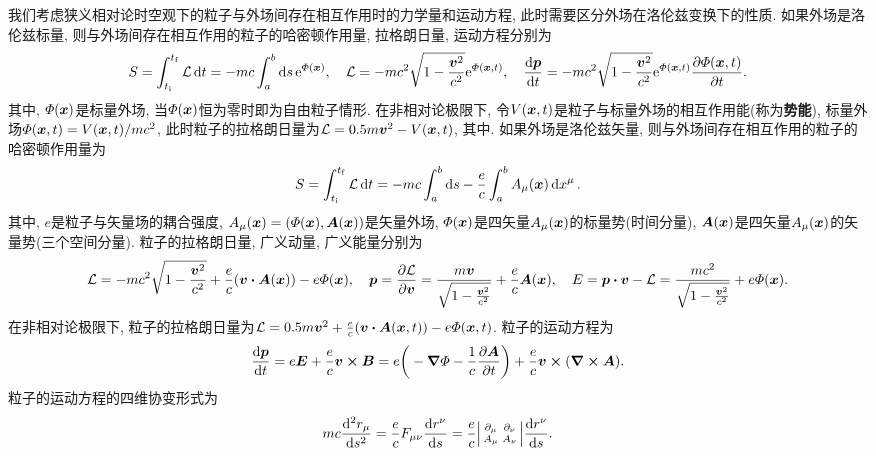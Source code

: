 我们考虑狭义相对论时空观下的粒子与外场间存在相互作用时的力学量和运动方程, 此时需要区分外场在洛伦兹变换下的性质. 如果外场是洛伦兹标量, 则与外场间存在相互作用的粒子的哈密顿作用量, 拉格朗日量, 运动方程分别为
\begin{equation*}
    S = \int_{t_{\mathrm{i}}}^{t_{\mathrm{f}}} \mathcal{L} \dd{t} = -mc \int_a^b \dd{s} \mathrm{e}^{\varPhi(\vb*{x})}, \quad \mathcal{L} = -mc^2 \sqrt{1-\frac{\vb*{v}^2}{c^2}} \mathrm{e}^{\varPhi(\vb*{x},t)}, \quad \dv{\vb*{p}}{t} = -mc^2 \sqrt{1-\frac{\vb*{v}^2}{c^2}} \mathrm{e}^{\varPhi(\vb*{x},t)} \pdv{\varPhi(\vb*{x},t)}{t}.
\end{equation*}
其中, $ \varPhi(\vb*{x}) $是标量外场, 当$ \varPhi(\vb*{x}) $恒为零时即为自由粒子情形. 在非相对论极限下, 令$ V(\vb*{x},t) $是粒子与标量外场的相互作用能(称为\textbf{势能}), 标量外场$ \varPhi(\vb*{x},t)=V(\vb*{x},t)/mc^2 $, 此时粒子的拉格朗日量为$ \mathcal{L} = 0.5 m\vb*{v}^2 - V(\vb*{x},t) $, 其中. 如果外场是洛伦兹矢量, 则与外场间存在相互作用的粒子的哈密顿作用量为
\begin{equation*}
    S = \int_{t_{\mathrm{i}}}^{t_{\mathrm{f}}} \mathcal{L} \dd{t} = -mc \int_a^b \dd{s} - \frac{e}{c} \int_a^b A_{\mu} (\vb*{x}) \dd{x^{\mu}}.
\end{equation*}
其中, $ e $是粒子与矢量场的耦合强度, $ A_{\mu} (\vb*{x})=(\varPhi(\vb*{x}),\vb*{A}(\vb*{x})) $是矢量外场, $ \varPhi(\vb*{x}) $是四矢量$ A_{\mu} (\vb*{x}) $的标量势(时间分量), $ \vb*{A}(\vb*{x}) $是四矢量$ A_{\mu} (\vb*{x}) $的矢量势(三个空间分量). 粒子的拉格朗日量, 广义动量, 广义能量分别为
\begin{equation*}
    \lagr = -mc^2 \sqrt{1-\frac{\vb*{v}^2}{c^2}} + \frac{e}{c} (\vb*{v} \vdot \vb*{A}(\vb*{x})) - e \varPhi(\vb*{x}), \quad \vb*{p} = \pdv{\lagr}{\vb*{v}} = \frac{m\vb*{v}}{\sqrt{1-\frac{\vb*{v}^2}{c^2}}} + \frac{e}{c} \vb*{A}(\vb*{x}), \quad E = \vb*{p} \vdot \vb*{v} - \lagr = \frac{mc^2}{\sqrt{1-\frac{\vb*{v}^2}{c^2}}} + e \varPhi(\vb*{x}).
\end{equation*}
在非相对论极限下, 粒子的拉格朗日量为$ \lagr = 0.5 m\vb*{v}^2 + \frac{e}{c} (\vb*{v} \vdot \vb*{A}(\vb*{x},t)) - e \varPhi(\vb*{x},t) $. 粒子的运动方程为
\begin{equation*}
    \dv{\vb*{p}}{t} = e\vb*{E} + \frac{e}{c} \vb*{v} \cross \vb*{B} = e \bigg( -\grad{\varPhi}-\frac{1}{c}\pdv{\vb*{A}}{t}\bigg) + \frac{e}{c} \vb*{v} \cross (\curl{\vb*{A}}).
\end{equation*}
粒子的运动方程的四维协变形式为
\begin{equation*}
    mc \dv[2]{r_{\mu}}{s} = \frac{e}{c} F_{\mu\nu} \dv{r^{\nu}}{s} = \frac{e}{c} \smdet{\partial_{\mu} & \partial_{\nu} \\ A_{\mu} & A_{\nu}} \dv{r^{\nu}}{s}.
\end{equation*}
